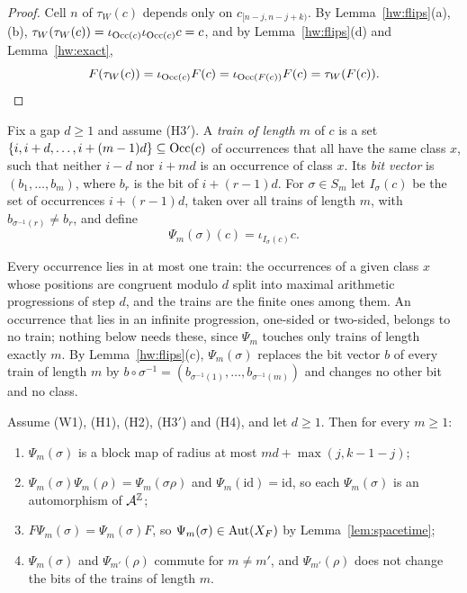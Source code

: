 \begin{proof}
Cell $n$ of $\tau_W(c)$ depends only on $c_{[n-j,n-j+k)}$. By Lemma~\ref{hw:flips}(a),(b), $\tau_W(\tau_W(c))=\iota_{\operatorname{Occ}(c)}\iota_{\operatorname{Occ}(c)}c=c$, and by Lemma~\ref{hw:flips}(d) and Lemma~\ref{hw:exact},
\[
F(\tau_W(c))=\iota_{\operatorname{Occ}(c)}F(c)=\iota_{\operatorname{Occ}(F(c))}F(c)=\tau_W(F(c)).
\]
\end{proof}

\begin{definition}\label{hw:train}
Fix a gap $d\ge1$ and assume (H3$'$). A \emph{train of length $m$} of $c$ is a set $\{i,i+d,\dots,i+(m-1)d\}\subseteq\operatorname{Occ}(c)$ of occurrences that all have the same class $x$, such that neither $i-d$ nor $i+md$ is an occurrence of class $x$. Its \emph{bit vector} is $(b_1,\dots,b_m)$, where $b_r$ is the bit of $i+(r-1)d$. For $\sigma\in S_m$ let $I_\sigma(c)$ be the set of occurrences $i+(r-1)d$, taken over all trains of length $m$, with $b_{\sigma^{-1}(r)}\ne b_r$, and define
\[
\Psi_m(\sigma)(c)=\iota_{I_\sigma(c)}c .
\]
\end{definition}

Every occurrence lies in at most one train: the occurrences of a given class $x$ whose positions are congruent modulo $d$ split into maximal arithmetic progressions of step $d$, and the trains are the finite ones among them. An occurrence that lies in an infinite progression, one-sided or two-sided, belongs to no train; nothing below needs these, since $\Psi_m$ touches only trains of length exactly $m$. By Lemma~\ref{hw:flips}(c), $\Psi_m(\sigma)$ replaces the bit vector $b$ of every train of length $m$ by $b\circ\sigma^{-1}=(b_{\sigma^{-1}(1)},\dots,b_{\sigma^{-1}(m)})$ and changes no other bit and no class.

\begin{lemma}\label{hw:trainlemma}
Assume \textup{(W1)}, \textup{(H1)}, \textup{(H2)}, \textup{(H3$'$)} and \textup{(H4)}, and let $d\ge1$. Then for every $m\ge1$:
\begin{enumerate}
\item[(i)] $\Psi_m(\sigma)$ is a block map of radius at most $md+\max(j,k-1-j)$;
\item[(ii)] $\Psi_m(\sigma)\Psi_m(\rho)=\Psi_m(\sigma\rho)$ and $\Psi_m(\mathrm{id})=\mathrm{id}$, so each $\Psi_m(\sigma)$ is an automorphism of $\mathcal{A}^{\mathbb{Z}}$;
\item[(iii)] $F\Psi_m(\sigma)=\Psi_m(\sigma)F$, so $\Psi_m(\sigma)\in\operatorname{Aut}(X_F)$ by Lemma~\ref{lem:spacetime};
\item[(iv)] $\Psi_m(\sigma)$ and $\Psi_{m'}(\rho)$ commute for $m\ne m'$, and $\Psi_{m'}(\rho)$ does not change the bits of the trains of length $m$.
\end{enumerate}
\end{lemma}

